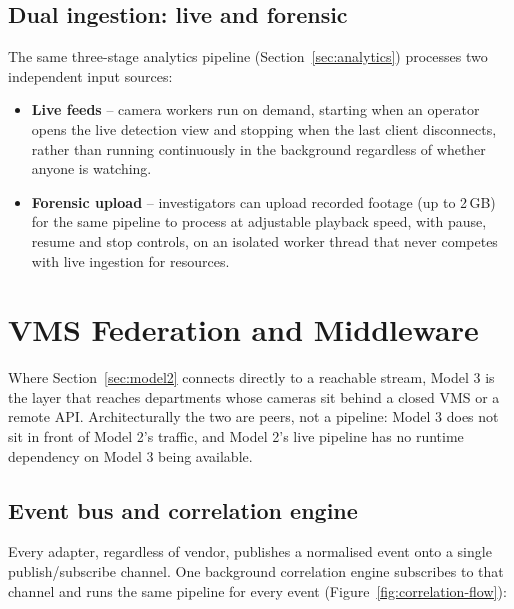 \documentclass[11pt,a4paper]{article}
\begin{document}
\subsection{Dual ingestion: live and forensic}

The same three-stage analytics pipeline (Section~\ref{sec:analytics})
processes two independent input sources:

\begin{itemize}
\item \textbf{Live feeds} -- camera workers run on demand, starting when an
  operator opens the live detection view and stopping when the last client
  disconnects, rather than running continuously in the background regardless
  of whether anyone is watching.
\item \textbf{Forensic upload} -- investigators can upload recorded footage
  (up to 2\,GB) for the same pipeline to process at adjustable playback
  speed, with pause, resume and stop controls, on an isolated worker thread
  that never competes with live ingestion for resources.
\end{itemize}

\section{VMS Federation and Middleware}
\label{sec:model3}

Where Section~\ref{sec:model2} connects directly to a reachable stream,
Model 3 is the layer that reaches departments whose cameras sit behind a
closed VMS or a remote API. Architecturally the two are peers, not a
pipeline: Model 3 does not sit in front of Model 2's traffic, and Model 2's
live pipeline has no runtime dependency on Model 3 being available.

\subsection{Event bus and correlation engine}

Every adapter, regardless of vendor, publishes a normalised event onto a
single publish/subscribe channel. One background correlation engine
subscribes to that channel and runs the same pipeline for every event
(Figure~\ref{fig:correlation-flow}):
\end{document}
